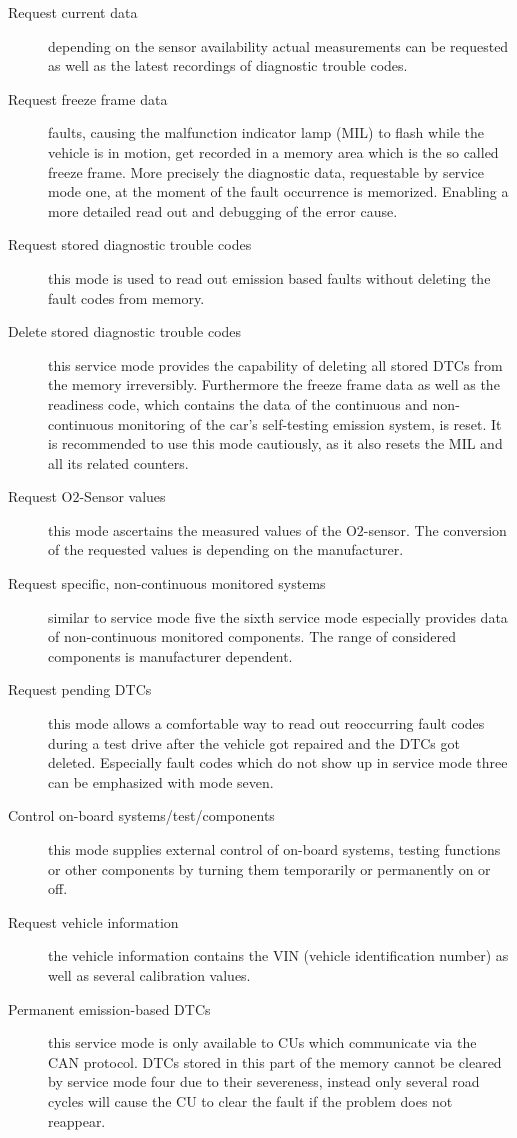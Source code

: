 \begin{description}
 \item[Request current data] depending on the sensor availability actual measurements can be requested as well as the latest recordings of diagnostic trouble codes.
 \item[Request freeze frame data] faults, causing the malfunction indicator lamp (MIL) to flash while the vehicle is in motion, get recorded in a memory area which is the so called freeze frame. More precisely the diagnostic data, requestable by service mode one, at the moment of the fault occurrence is memorized. Enabling a more detailed read out and debugging of the error cause.
 \item[Request stored diagnostic trouble codes] this mode is used to read out emission based faults without deleting the fault codes from memory.
 \item[Delete stored diagnostic trouble codes] this service mode provides the capability of deleting all stored DTCs from the memory irreversibly. Furthermore the freeze frame data as well as the readiness code, which contains the data of the continuous and non-continuous monitoring of the car’s self-testing emission system, is reset. It is recommended to use this mode cautiously, as it also resets the MIL and all its related counters.
 \item[Request O$2$-Sensor values] this mode ascertains the measured values of the O$2$-sensor. The conversion of the requested values is depending on the manufacturer.
 \item[Request specific, non-continuous monitored systems] similar to service mode five the sixth service mode especially provides data of non-continuous monitored components. The range of considered components is  manufacturer dependent.
 \item[Request pending DTCs] this mode allows a comfortable way to read out reoccurring fault codes during a test drive after the vehicle got repaired and the DTCs got deleted. Especially fault codes which do not show up in service mode three can be emphasized with mode seven.
 \item[Control on-board systems/test/components]  this mode supplies external control of on-board systems, testing functions or other components by turning them temporarily or permanently  on or off.
 \item[Request vehicle information] the vehicle information contains the VIN (vehicle identification number) as well as several calibration values.
 \item[Permanent emission-based DTCs] this service mode is only available to CUs which communicate via the CAN protocol. DTCs stored in this part of the memory cannot be cleared by service mode four due to their severeness, instead only several road cycles will cause the CU to clear the fault if the problem does not reappear.
\end{description}


